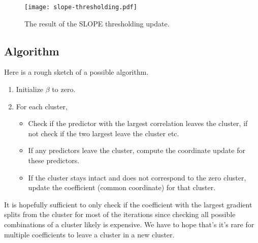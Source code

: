 \begin{figure}[htbp]
  \centering
  \texttt{[image: slope-thresholding.pdf]}
  \caption{The result of the SLOPE thresholding update.}
  \label{fig:slope-thresholding}
\end{figure}

\subsection{Algorithm}

Here is a rough sketch of a possible algorithm.
\begin{enumerate}
  \item Initialize \(\beta\) to zero.
  \item For each cluster,
        \begin{itemize}
          \item Check if the predictor with the largest correlation leaves the
                cluster, if not check if the two largest leave the cluster etc.
          \item If any predictors leave the cluster, compute the coordinate
                update for these predictors.
          \item If the cluster stays intact and does not correspond to the
                zero cluster, update the coefficient (common coordinate) for that
                cluster.
        \end{itemize}
\end{enumerate}
It is hopefully sufficient to only check if the coefficient with the
largest gradient splits from the cluster for most of the iterations since
checking all possible combinations of a cluster likely is expensive.
We have
to hope that's it's rare for multiple coefficients to leave a cluster in
a new cluster.
